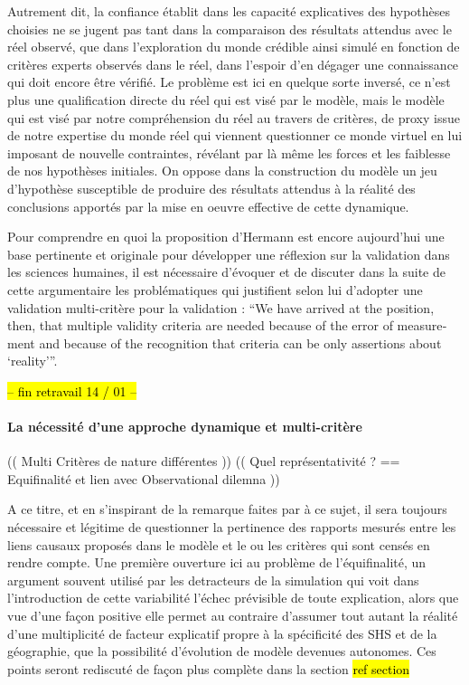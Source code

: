 Autrement dit, la confiance établit dans les capacité explicatives des hypothèses choisies ne se jugent pas tant dans la comparaison des résultats attendus avec le réel observé, que dans l'exploration du monde crédible ainsi simulé en fonction de critères experts observés dans le réel, dans l'espoir d'en dégager une connaissance qui doit encore être vérifié. Le problème est ici en quelque sorte inversé, ce n'est plus une qualification directe du réel qui est visé par le modèle, mais le modèle qui est visé par notre compréhension du réel au travers de critères, de proxy issue de notre expertise du monde réel qui viennent questionner ce monde virtuel en lui imposant de nouvelle contraintes, révélant par là même les forces et les faiblesse de nos hypothèses initiales. On oppose dans la construction du modèle un jeu d'hypothèse susceptible de produire des résultats attendus à la réalité des conclusions apportés par la mise en oeuvre effective de cette dynamique.

Pour comprendre en quoi la proposition d'Hermann est encore aujourd'hui une base pertinente et originale pour développer une réflexion sur la validation dans les sciences humaines, il est nécessaire d'évoquer et de discuter dans la suite de cette argumentaire les problématiques qui justifient selon lui d'adopter une validation multi-critère pour la validation : \foreignquote{english}{We have arrived at the position, then, that multiple validity criteria are needed because of the error of measurement and because of the recognition that criteria can be only assertions about \enquote{reality}}.

\hl{ -- fin retravail 14 / 01 -- }

\paragraph{La nécessité d'une approche dynamique et multi-critère}

(( Multi Critères de nature différentes ))
(( Quel représentativité ? == Equifinalité et lien avec Observational dilemna ))

A ce titre, et en s'inspirant de la remarque faites par \textcite{Bulle2005} à ce sujet, il sera toujours nécessaire et légitime de questionner la pertinence des rapports mesurés entre les liens causaux proposés dans le modèle et le ou les critères qui sont censés en rendre compte. Une première ouverture ici au problème de l'équifinalité, un argument souvent utilisé par les detracteurs de la simulation qui voit dans l'introduction de cette variabilité l'échec prévisible de toute explication, alors que vue d'une façon positive elle permet au contraire d'assumer tout autant la réalité d'une multiplicité de facteur explicatif propre à la spécificité des SHS et de la géographie, que la possibilité d'évolution de modèle devenues autonomes. Ces points seront rediscuté de façon plus complète dans la section \hl{ref section}


